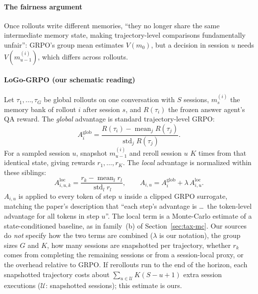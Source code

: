 \paragraph{The fairness argument}
Once rollouts write different memories, ``they no longer share the same intermediate memory state, making trajectory-level comparisons fundamentally unfair''\unverified: GRPO's group mean estimates $V(m_0)$, but a decision in session $u$ needs $V(m^{(i)}_{u-1})$, which differs across rollouts.

\paragraph{LoGo-GRPO (our schematic reading)}
Let $\tau_1,\dots,\tau_G$ be global rollouts on one conversation with $S$ sessions, $m^{(i)}_{s}$ the memory bank of rollout $i$ after session $s$, and $R(\tau_i)$ the frozen answer agent's QA reward. The \emph{global} advantage is standard trajectory-level GRPO:
\begin{equation}
A^{\mathrm{glob}}_i=\frac{R(\tau_i)-\operatorname{mean}_{j}R(\tau_j)}{\operatorname{std}_{j}R(\tau_j)}.
\end{equation}
For a sampled session $u$, snapshot $m^{(i)}_{u-1}$ and reroll session $u$ $K$ times from that identical state, giving rewards $r_1,\dots,r_K$. The \emph{local} advantage is normalized within these siblings:
\begin{equation}
A^{\mathrm{loc}}_{i,u,k}=\frac{r_k-\operatorname{mean}_{l}r_l}{\operatorname{std}_{l}r_l},\qquad
A_{i,u}=A^{\mathrm{glob}}_i+\lambda\,A^{\mathrm{loc}}_{i,u}.
\end{equation}
$A_{i,u}$ is applied to every token of step $u$ inside a clipped GRPO surrogate, matching the paper's description that ``each step's advantage is \ldots\ the token-level advantage for all tokens in step $u$''\unverified. The local term is a Monte-Carlo estimate of a state-conditioned baseline, as in family~(b) of Section~\ref{sec:tax-mc}.
Our sources do \emph{not} specify how the two terms are combined ($\lambda$ is our notation), the group sizes $G$ and $K$, how many sessions are snapshotted per trajectory, whether $r_k$ comes from completing the remaining sessions or from a session-local proxy, or the overhead relative to GRPO. If rerollouts run to the end of the horizon, each snapshotted trajectory costs about $\sum_{u\in\mathcal U}K(S-u+1)$ extra session executions ($\mathcal U$: snapshotted sessions); this estimate is ours.

